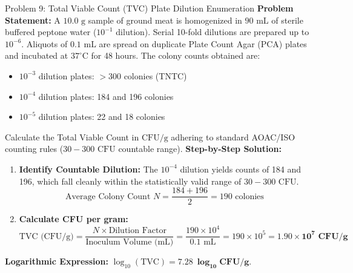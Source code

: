 \documentclass[11pt,a4paper,oneside]{article}
\begin{document}
\begin{examplebox}{Problem 9: Total Viable Count (TVC) Plate Dilution Enumeration}
\textbf{Problem Statement:}
A $10.0\text{ g}$ sample of ground meat is homogenized in $90\text{ mL}$ of sterile buffered peptone water ($10^{-1}$ dilution). Serial 10-fold dilutions are prepared up to $10^{-6}$. Aliquots of $0.1\text{ mL}$ are spread on duplicate Plate Count Agar (PCA) plates and incubated at $37^\circ\text{C}$ for 48 hours. The colony counts obtained are:
\begin{itemize}
    \item $10^{-3}$ dilution plates: $>300$ colonies (TNTC)
    \item $10^{-4}$ dilution plates: 184 and 196 colonies
    \item $10^{-5}$ dilution plates: 22 and 18 colonies
\end{itemize}
Calculate the Total Viable Count in $\text{CFU/g}$ adhering to standard AOAC/ISO counting rules ($30-300\text{ CFU}$ countable range).
\vspace{0.2cm}
\textbf{Step-by-Step Solution:}
\begin{enumerate}
    \item \textbf{Identify Countable Dilution:}
    The $10^{-4}$ dilution yields counts of 184 and 196, which fall cleanly within the statistically valid range of $30-300\text{ CFU}$.
    $$\text{Average Colony Count } N = \frac{184 + 196}{2} = 190\text{ colonies}$$
    
    \item \textbf{Calculate CFU per gram:}
    $$\text{TVC (CFU/g)} = \frac{N \times \text{Dilution Factor}}{\text{Inoculum Volume (mL)}} = \frac{190 \times 10^4}{0.1\text{ mL}} = 190 \times 10^5 = \mathbf{1.90 \times 10^7\text{ CFU/g}}$$
\end{enumerate}
\textbf{Logarithmic Expression:} $\log_{10}(\text{TVC}) = \mathbf{7.28\ \log_{10}\text{CFU/g}}$.
\end{examplebox}
\end{document}
